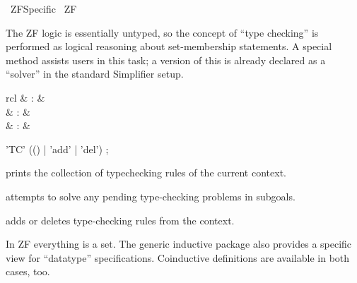 %
\begin{isabellebody}%
\def\isabellecontext{ZF{\isacharunderscore}Specific}%
%
\isadelimtheory
\isanewline
\isanewline
%
\endisadelimtheory
%
\isatagtheory
{}\isamarkupfalse%
\ ZF{\isacharunderscore}Specific\isanewline
{}\ ZF\isanewline
{}%
\endisatagtheory
{\isafoldtheory}%
%
\isadelimtheory
%
\endisadelimtheory
%
\isamarkuptrue%
%
\isamarkuptrue%
%
\begin{isamarkuptext}%
The ZF logic is essentially untyped, so the concept of ``type
  checking'' is performed as logical reasoning about set-membership
  statements.  A special method assists users in this task; a version
  of this is already declared as a ``solver'' in the standard
  Simplifier setup.

  \begin{matharray}{rcl}
    \mbox{}\isa{{\isachardoublequote}\isactrlsup {\isacharasterisk}{\isachardoublequote}} & : &  \\
    \mbox{} & : & \isarmeth \\
    \mbox{} & : & \isaratt \\
  \end{matharray}

  \begin{rail}
    'TC' (() | 'add' | 'del')
    ;
  \end{rail}

  \begin{descr}
  
  \item [\mbox{\isa{\isacommand{print{\isacharunderscore}tcset}}}] prints the collection of
  typechecking rules of the current context.
  
  \item [\mbox{\isa{typecheck}}] attempts to solve any pending
  type-checking problems in subgoals.
  
  \item [\mbox{\isa{TC}}] adds or deletes type-checking rules
  from the context.

  \end{descr}%
\end{isamarkuptext}%
\isamarkuptrue%
%
\isamarkuptrue%
%
\isamarkuptrue%
%
\begin{isamarkuptext}%
In ZF everything is a set.  The generic inductive package also
  provides a specific view for ``datatype'' specifications.
  Coinductive definitions are available in both cases, too.


\end{isamarkuptext}
\end{isabellebody}
